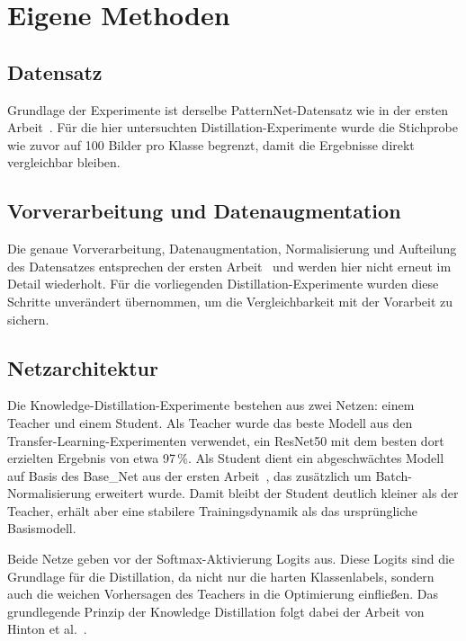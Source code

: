 \section{Eigene Methoden}
\label{sec:methode}

\subsection{Datensatz}
\label{subsec:datensatz}

Grundlage der Experimente ist derselbe PatternNet-Datensatz wie in der ersten Arbeit~\cite{steidlehenssler2026milestone1}.
Für die hier untersuchten Distillation-Experimente wurde die Stichprobe wie zuvor auf 100 Bilder pro Klasse begrenzt, damit die Ergebnisse direkt vergleichbar bleiben.

\subsection{Vorverarbeitung und Datenaugmentation}
\label{subsec:augmentation}

Die genaue Vorverarbeitung, Datenaugmentation, Normalisierung und Aufteilung des Datensatzes entsprechen der ersten Arbeit~\cite{steidlehenssler2026milestone1} und werden hier nicht erneut im Detail wiederholt.
Für die vorliegenden Distillation-Experimente wurden diese Schritte unverändert übernommen, um die Vergleichbarkeit mit der Vorarbeit zu sichern.

\subsection{Netzarchitektur}
\label{subsec:architektur}

Die Knowledge-Distillation-Experimente bestehen aus zwei Netzen: einem Teacher und einem Student.
Als Teacher wurde das beste Modell aus den Transfer-Learning-Experimenten verwendet, ein ResNet50 mit dem besten dort erzielten Ergebnis von etwa 97\,\%.
Als Student dient ein abgeschwächtes Modell auf Basis des Base\_Net aus der ersten Arbeit~\cite{steidlehenssler2026milestone1}, das zusätzlich um Batch-Normalisierung erweitert wurde.
Damit bleibt der Student deutlich kleiner als der Teacher, erhält aber eine stabilere Trainingsdynamik als das ursprüngliche Basismodell.

Beide Netze geben vor der Softmax-Aktivierung Logits aus.
Diese Logits sind die Grundlage für die Distillation, da nicht nur die harten Klassenlabels, sondern auch die weichen Vorhersagen des Teachers in die Optimierung einfließen.
Das grundlegende Prinzip der Knowledge Distillation folgt dabei der Arbeit von Hinton et al.~\cite{hinton2015distilling}.

